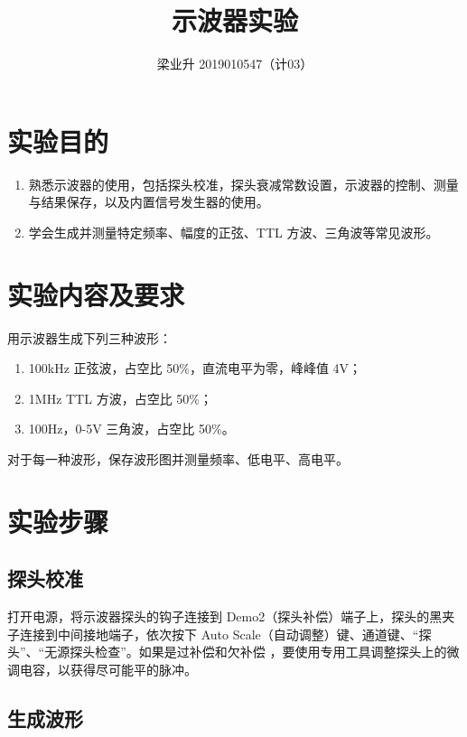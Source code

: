 \documentclass[a4paper]{article}
\begin{document}
\title{示波器实验}
\author{梁业升 2019010547（计03）}

\maketitle

\section{实验目的}

\begin{enumerate}
    \item 熟悉示波器的使用，包括探头校准，探头衰减常数设置，示波器的控制、测量与结果保存，以及内置信号发生器的使用。
    \item 学会生成并测量特定频率、幅度的正弦、TTL 方波、三角波等常见波形。
\end{enumerate}

\section{实验内容及要求}

用示波器生成下列三种波形：

\begin{enumerate}
    \item 100kHz 正弦波，占空比 50\%，直流电平为零，峰峰值 4V；
    \item 1MHz TTL 方波，占空比 50\%；
    \item 100Hz，0-5V 三角波，占空比 50\%。
\end{enumerate}

对于每一种波形，保存波形图并测量频率、低电平、高电平。

\section{实验步骤}

\subsection{探头校准}

打开电源，将示波器探头的钩子连接到 Demo2（探头补偿）端子上，探头的黑夹子连接到中间接地端子，依次按下 Auto Scale（自动调整）键、通道键、“探头”、“无源探头检查”。如果是过补偿和欠补偿 ，要使用专用工具调整探头上的微调电容，以获得尽可能平的脉冲。

\subsection{生成波形}
\end{document}
